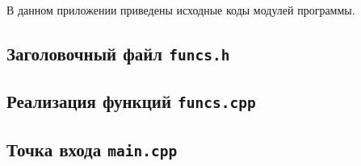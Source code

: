 \documentclass[12pt,a4paper]{article}
\begin{document}
В данном приложении приведены исходные коды модулей программы.

\subsection{Заголовочный файл \texttt{funcs.h}}


\subsection{Реализация функций \texttt{funcs.cpp}}


\subsection{Точка входа \texttt{main.cpp}}

\end{document}
